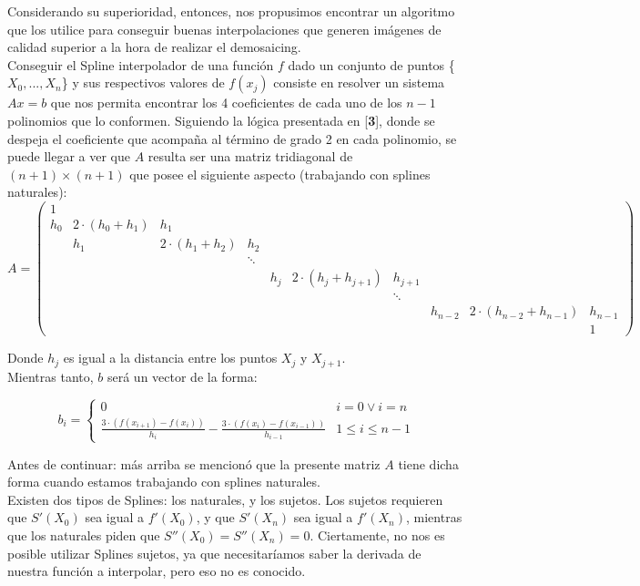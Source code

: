 \documentclass[a4paper]{article}
\begin{document}
Considerando su superioridad, entonces, nos propusimos encontrar un algoritmo que los utilice para conseguir buenas interpolaciones que generen imágenes de calidad superior a la hora de realizar el demosaicing.\\

Conseguir el Spline interpolador de una función $f$ dado un conjunto de puntos \{\(X_0, ..., X_n\)\} y sus respectivos valores de $f(x_j)$ consiste en resolver un sistema \(Ax = b\) que nos permita encontrar los 4 coeficientes de cada uno de los $n-1$ polinomios que lo conformen. Siguiendo la lógica presentada en [\textbf{3}], donde se despeja el coeficiente que acompaña al término de grado 2 en cada polinomio, se puede llegar a ver que $A$ resulta ser una matriz tridiagonal de $(n+1)\times(n+1)$ que posee el siguiente aspecto (trabajando con splines naturales): \\

\[
A = \left(
\begin{array}{cccccccccc}
1 &  &  &  &  &  &  & &  & \\
h_0 & 2\cdot(h_0+h_1) & h_1 &   & & & & &  & \\
 & h_1 & 2\cdot(h_1+h_2) & h_2 & & & & &  & \\
 &  &  & \ddots &  &  &  &  &  &  \\
 &  &  &  & h_j & 2\cdot(h_j+h_{j+1}) & h_{j+1} & &  & \\
 &  &  &  &  &  & \ddots &  &  &  \\
 &  &  &  &  & & & h_{n-2} & 2\cdot(h_{n-2}+h_{n-1}) &h_{n-1}\\
 &  &  &  &  &  &  &  &  & 1
\end{array}
\right)
\]

\bigskip
\noindent Donde $h_j$ es igual a la distancia entre los puntos $X_j$ y $X_{j+1}$. \\
Mientras tanto, $b$ será un vector de la forma:

\[
b_i =
\begin{cases}
0 & i = 0 \lor i = n \\
\frac{3\cdot(f(x_{i+1})-f(x_i))}{h_i} - \frac{3\cdot(f(x_i)-f(x_{i-1}))}{h_{i-1}} & 1 \leq i \leq n-1
\end{cases}
\]

\bigskip
Antes de continuar: más arriba se mencionó que la presente matriz $A$ tiene dicha forma cuando estamos trabajando con splines naturales.\\
Existen dos tipos de Splines: los naturales, y los sujetos. Los sujetos requieren que $S'(X_0)$ sea igual a $f'(X_0)$, y que $S'(X_n)$ sea igual a $f'(X_n)$, mientras que los naturales piden que $S''(X_0) = S''(X_n) = 0$. Ciertamente, no nos es posible utilizar Splines sujetos, ya que necesitaríamos saber la derivada de nuestra función a interpolar, pero eso no es conocido.\\
\end{document}
